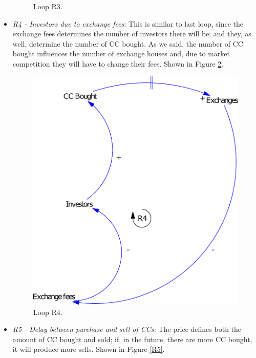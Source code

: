 \begin{itemize}
\begin{figure}[H]
        \caption{Loop R3.}
        \label{R3}
	\end{figure}
    \item \textit{R4 - Investors due to exchange fees:} This is similar to last loop, since the exchange fees determines the number of investors there will be; and they, as well, determine the number of CC bought. As we said, the number of CC bought influences the number of exchange houses and, due to market competition they will have to change their fees. Shown in Figure \ref{R4}.
    \begin{figure}[H]
		\centering
        \includegraphics[scale=0.5]{files/R4.pdf}
        \caption{Loop R4.}
        \label{R4}
	\end{figure}
    \item \textit{R5 - Delay between purchase and sell of CCs:} The price defines both the amount of CC bought and sold; if, in the future, there are more CC bought, it will produce more sells. Shown in Figure \ref{R5}.
    \begin{figure}[H]
		\centering

\end{figure}
\end{itemize}
